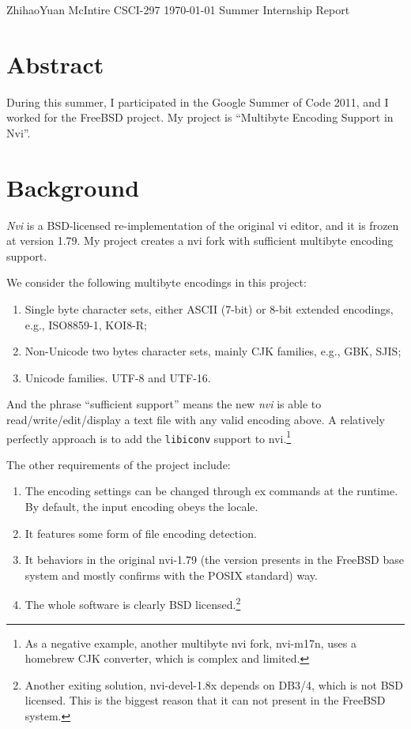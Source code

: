 \documentclass[11pt,twoside,a4paper]{article}
\begin{document}
\begin{mla}
	{Zhihao}{Yuan}
	{McIntire}
	{CSCI-297}
	{\today}
	{Summer Internship Report}
\setlength{\parindent}{0em}

\section*{Abstract}

During this summer, I participated in the Google Summer of Code 2011, and I
worked for the FreeBSD project.  My project is ``Multibyte Encoding Support
in Nvi''\cite{1}.

\section{Background}

\emph{Nvi} is a BSD-licensed re-implementation of the original vi editor,
and it is frozen at version 1.79.  My project creates a nvi fork with sufficient multibyte encoding support.

We consider the following multibyte encodings in this project:

\begin{enumerate}
	\item Single byte character sets, either ASCII (7-bit) or 8-bit extended
	   	encodings, e.g., ISO8859-1, KOI8-R;
	\item Non-Unicode two bytes character sets, mainly CJK families, e.g.,
		GBK, SJIS;
	\item Unicode families. UTF-8 and UTF-16.
\end{enumerate}

And the phrase ``sufficient support'' means the new \emph{nvi} is able to
read/write/edit/display a text file with any valid encoding above. A relatively
perfectly approach is to add the \verb|libiconv| support to nvi.\footnote{As
	a negative example, another multibyte nvi fork, nvi-m17n, uses a homebrew
	CJK converter,\cite{3} which is complex and limited.}

The other requirements of the project include:

\begin{enumerate}
	\item The encoding settings can be changed through ex commands at the
		runtime. By default, the input encoding obeys the locale.
	\item It features some form of file encoding detection.
	\item It behaviors in the original nvi-1.79 (the version presents in
		the FreeBSD base system and mostly confirms with the POSIX
		standard) way.
	\item The whole software is clearly BSD licensed.\footnote{Another
			exiting solution, nvi-devel-1.8x\cite{4} depends on DB3/4, which is not
			BSD licensed. This is the biggest reason that it can not present
			in the FreeBSD system.}
\end{enumerate}


\end{mla}
\end{document}
